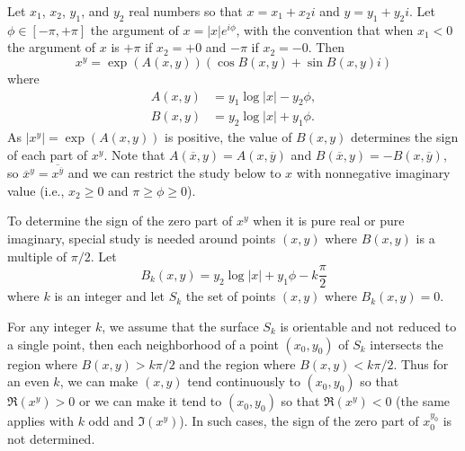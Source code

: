 \documentclass [12pt]{article}
\renewcommand {\geq}{\geqslant}
\begin{document}
Let $x_1$, $x_2$, $y_1$, and $y_2$ real numbers so that $x = x_1 + x_2 i$ and
$y = y_1 + y_2 i$.
Let $\phi \in [-\pi, +\pi]$ the argument of $x = |x| e^{i\phi}$, with the
convention that when $x_1 < 0$ the argument of $x$ is $+\pi$ if $x_2 = +0$ and
$-\pi$ if $x_2 = -0$.
Then
\[
x^y=\exp\left(A(x,y)\right) \left(\cos B(x,y)+\sin B(x,y) i\right)
\] where
\begin {align*}
  A(x,y) & =  y_1\log|x|-y_2\phi,\\
  B(x,y) & =  y_2\log|x|+y_1\phi.
\end {align*}
As $|x^y| = \exp\left(A(x,y)\right)$ is positive, the value of $B(x,y)$
determines the sign of each part of $x^y$.
Note that $A(\overline{x},y) = A(x,\overline{y})$ and $B(\overline{x},
y)=-B(x,\overline{y})$, so $\overline{x}^y = \overline{x^{\overline{y}}}$ and
we can restrict the study below to $x$ with nonnegative imaginary value
(i.e., $x_2 \geq 0$ and $\pi \geq \phi \geq 0$).

To determine the sign of the zero part of $x^y$ when it is pure real or pure
imaginary, special study is needed around points $(x, y)$ where $B(x, y)$ is a
multiple of $\pi/2$.
Let
\begin {equation}
  \label {eqn:Bk}
  B_k(x, y) = y_2 \log|x| +y_1\phi -k\frac{\pi}{2}
\end {equation}
where $k$ is an integer and let $S_k$ the set of points $(x, y)$ where $B_k(x,
y) = 0$.

For any integer $k$, we assume that the surface $S_k$ is orientable and not
reduced to a single point, then each neighborhood of a point $(x_0, y_0)$ of
$S_k$ intersects the region where $B(x, y) > k\pi/2$ and the region where $B(x,
y) < k\pi/2$.
Thus for an even $k$, we can make $(x, y)$ tend continuously to $(x_0, y_0)$
so that $\Re(x^y) > 0$ or we can make it tend to $(x_0, y_0)$ so that
$\Re(x^y) < 0$ (the same applies with $k$ odd and $\Im(x^y)$).
In such cases, the sign of the zero part of $x_0^{y_0}$ is not determined.
\end{document}
